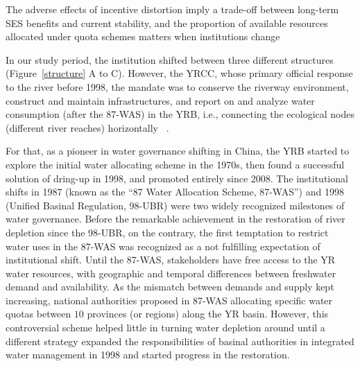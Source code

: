 The adverse effects of incentive distortion imply a trade-off between long-term SES benefits and current stability, and the proportion of available resources allocated under quota schemes matters when institutions change \cite{lade2013}


In our study period, the institution shifted between three different structures (Figure~\ref{structure} A to C).
However, the YRCC, whose primary official response to the river before 1998, the mandate was to conserve the riverway environment, construct and maintain infrastructures, and report on and analyze water consumption (after the 87-WAS) in the YRB, i.e., connecting the ecological nodes (different river reaches) horizontally ~\cite{wang2019a}.

For that, as a pioneer in water governance shifting in China, the YRB started to explore the initial water allocating scheme in the 1970s, then found a successful solution of dring-up in 1998, and promoted entirely since 2008.
The institutional shifts in 1987 (known as the ``87 Water Allocation Scheme, 87-WAS'') and 1998 (Unified Basinal Regulation, 98-UBR) were two widely recognized milestones of water governance.
Before the remarkable achievement in the restoration of river depletion since the 98-UBR, on the contrary, the first temptation to restrict water uses in the 87-WAS was recognized as a not fulfilling expectation of institutional shift.
Until the 87-WAS, stakeholders have free access to the YR water resources, with geographic and temporal differences between freshwater demand and availability.
As the mismatch between demands and supply kept increasing, national authorities proposed in 87-WAS allocating specific water quotas between $10$ provinces (or regions) along the YR basin.
However, this controversial scheme helped little in turning water depletion around until a different strategy expanded the responsibilities of basinal authorities in integrated water management in 1998 and started progress in the restoration.

